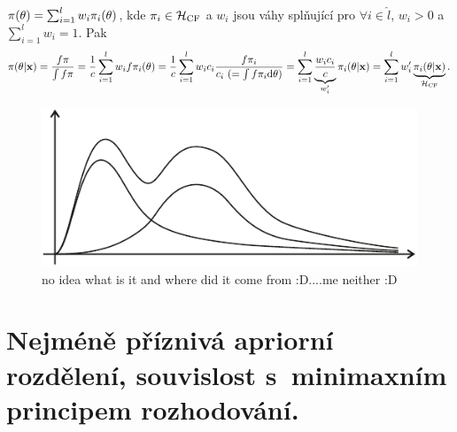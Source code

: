 \begin{remark}[Směs z CF]
	$\pi(\theta)=\sum_{i=1}^lw_i\pi_i(\theta)$, kde $\pi_i\in\mathcal{H}_\mathrm{CF}$ a $w_i$ jsou váhy splňující pro $\forall i\in\hat{l}$, $w_i>0$ a $\sum_{i=1}^l w_i=1$. Pak $$\pi(\theta|\textbf{x})=\frac{f\pi}{\int f\pi}=\frac{1}{c}\sum_{i=1}^lw_i f\pi_i(\theta)=\frac{1}{c}\sum_{i=1}^l w_ic_i\frac{f \pi_i}{c_i~(=\int f\pi_i\mathrm{d}\theta)}=\sum_{i=1}^l \underbrace{\frac{w_ic_i}{c}}_{w_i'}\pi_i(\theta|\textbf{x})=\sum_{i=1}^l w_i'\underbrace{\pi_i(\theta|\textbf{x})}_{\mathcal{H}_\mathrm{CF}}.$$
		\begin{figure}[h]
			\centering
			\includegraphics[width=0.6\linewidth]{pictures/8_1.pdf}
			\caption{no idea what is it and where did it come from :D....me neither :D}
			\label{fig:81}
		\end{figure}
		
\end{remark}

\chapter{Nejméně příznivá apriorní rozdělení, souvislost s~minimaxním principem rozhodování.}

